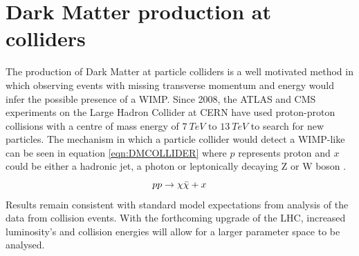 \section{Dark Matter production at colliders}\label{sec:colliders}
The production of Dark Matter at particle colliders is a well motivated method in which observing events with missing transverse momentum and energy would infer the possible presence of a WIMP. Since 2008, the ATLAS and CMS experiments on the Large Hadron Collider at CERN have used proton-proton collisions with a centre of mass energy of $7\:TeV\textrm{ to }13\:TeV$ to search for new particles. The mechanism in which a particle collider would detect a WIMP-like can be seen in equation \ref{eqn:DMCOLLIDER} where $p$ represents proton and $x$ could be either a hadronic jet, a photon or leptonically decaying Z or W boson \cite{DirectDetection2015}.
\begin{equation}\label{eqn:DMCOLLIDER}
   pp \rightarrow \chi\Bar{\chi} + x
\end{equation}
Results remain consistent with standard model expectations from analysis of the data from collision events. With the forthcoming upgrade of the LHC, increased luminosity's and collision energies will allow for a larger parameter space to be analysed.

